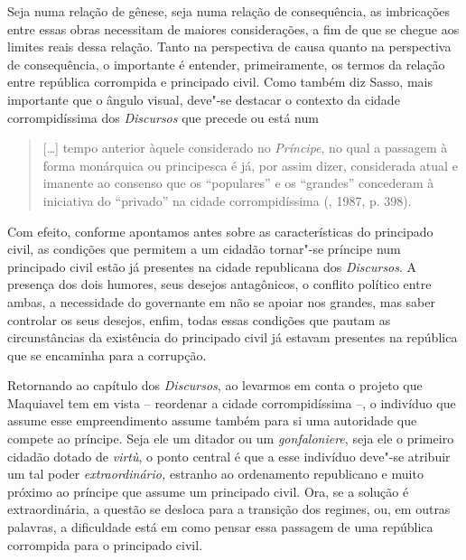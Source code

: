 Seja numa relação de gênese, seja numa relação de consequência, as
imbricações entre essas obras necessitam de maiores considerações, a fim
de que se chegue aos limites reais dessa relação. Tanto na perspectiva
de causa quanto na perspectiva de consequência, o importante é entender,
primeiramente, os termos da relação entre república corrompida e
principado civil. Como também diz Sasso, mais importante que o ângulo
visual, deve"-se destacar o contexto da cidade corrompidíssima dos
\emph{Discursos} que precede ou está num

\begin{quote}
{[}\ldots{}{]} tempo anterior àquele considerado no \emph{Príncipe}, no
qual a passagem à forma monárquica ou principesca é já, por assim dizer,
considerada atual e imanente ao consenso que os ``populares'' e os
``grandes'' concederam à iniciativa do ``privado'' na cidade
corrompidíssima (, 1987, p. 398).
\end{quote}

Com efeito, conforme apontamos antes sobre as características do
principado civil, as condições que permitem a um cidadão tornar"-se
príncipe num principado civil estão já presentes na cidade republicana
dos \emph{Discursos}. A presença dos dois humores, seus desejos
antagônicos, o conflito político entre ambas, a necessidade do
governante em não se apoiar nos grandes, mas saber controlar os seus
desejos, enfim, todas essas condições que pautam as circunstâncias da
existência do principado civil já estavam presentes na república que se
encaminha para a corrupção.

Retornando ao capítulo  dos \emph{Discursos}, ao levarmos em conta
o projeto que Maquiavel tem em vista -- reordenar a cidade
corrompidíssima --, o indivíduo que assume esse empreendimento assume
também para si uma autoridade que compete ao príncipe. Seja ele um
ditador ou um \emph{gonfaloniere}, seja ele o primeiro cidadão dotado de
\emph{virtù}, o ponto central é que a esse indivíduo deve"-se atribuir um
tal poder \emph{extraordinário,} estranho ao ordenamento republicano e
muito próximo ao príncipe que assume um principado civil. Ora, se a
solução é extraordinária, a questão se desloca para a transição dos
regimes, ou, em outras palavras, a dificuldade está em como pensar essa
passagem de uma república corrompida para o principado civil.

